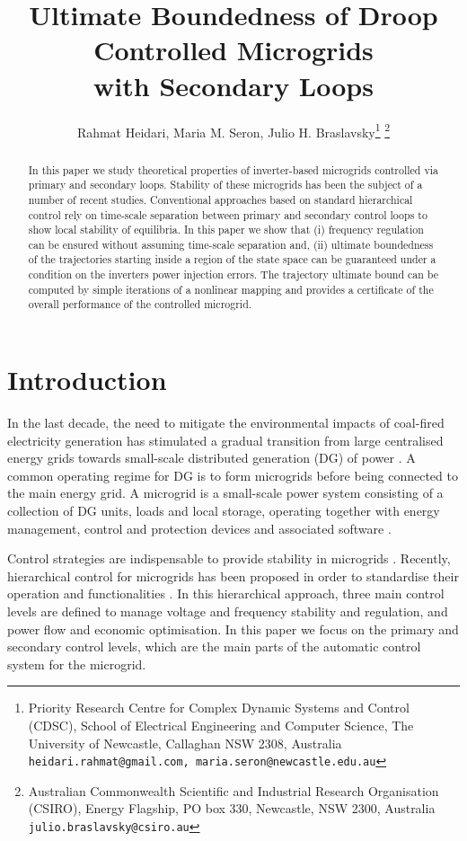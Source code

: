 \documentclass[letter, 10pt, conference]{ieeeconf}
\title{Ultimate Boundedness of Droop Controlled Microgrids \\with
  Secondary Loops}
\author{Rahmat Heidari, Maria M.  Seron, Julio
 H. Braslavsky\thanks{ Priority Research Centre for Complex Dynamic Systems
   and Control (CDSC), School of Electrical Engineering and Computer
   Science, The University of Newcastle, Callaghan NSW 2308,
   Australia {\tt\scriptsize heidari.rahmat@gmail.com, 
     maria.seron@newcastle.edu.au}} \thanks{ Australian Commonwealth Scientific and Industrial
   Research Organisation (CSIRO),  Energy Flagship,
   PO box 330, Newcastle, NSW 2300, Australia {\tt\scriptsize
     julio.braslavsky@csiro.au}} }
\newcommand{\1}{\mathbf{1}}
\newcommand{\0}{\mathbf{0}}
\begin{document}
\maketitle
\thispagestyle{empty}
\pagestyle{empty}


\begin{abstract}
  In this paper we study theoretical properties of inverter-based
  microgrids controlled via primary and secondary loops.
  Stability of these microgrids has been the subject of a number of 
  recent studies.  Conventional approaches based on standard hierarchical
  control rely on time-scale separation between primary and secondary
  control loops to show local stability of equilibria. In this paper 
  we show that (i) frequency regulation can be ensured
  without assuming time-scale separation and, (ii) ultimate boundedness
  of the trajectories starting inside a region of the state space can be
  guaranteed under a condition on the inverters power injection
  errors. The trajectory ultimate bound can be computed by simple
  iterations of a nonlinear mapping and provides a certificate of the
  overall performance of the controlled microgrid.
\end{abstract}

\section{Introduction}
In the last decade, the need to mitigate the environmental impacts of
coal-fired electricity generation has stimulated a gradual transition
from large centralised energy grids towards small-scale distributed
generation (DG) of power \cite{Ustun2011}.  A common operating regime
for DG is to form microgrids before being connected to the main energy
grid.  A microgrid is a small-scale power system consisting of a
collection of DG units, loads and local storage, operating together
with energy management, control and protection devices and associated
software \cite{Lasseter01,PLT09}.

Control strategies are indispensable to provide stability in
microgrids \cite{PMM06}. Recently, hierarchical control for microgrids
has been proposed in order to standardise their operation and
functionalities \cite{GVMdVC11,Bidram2012}. In this hierarchical
approach, three main control levels are defined to manage voltage and
frequency stability and regulation, and power flow and economic
optimisation. In this paper we focus on the primary and secondary
control levels, which are the main parts of the automatic control
system for the microgrid.
\end{document}
